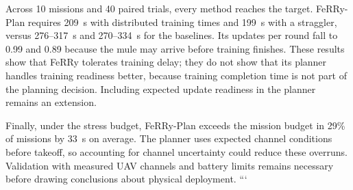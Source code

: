 \documentclass[conference]{IEEEtran}
\newcommand{\sysname}{FeRRy}
\begin{document}
Across 10 missions and 40 paired trials, every method reaches the target.
\sysname{}-Plan requires 209~s with distributed training times and 199~s with
a straggler, versus 276--317~s and 270--334~s for the baselines. Its updates
per round fall to 0.99 and 0.89 because the mule may arrive before training
finishes. These results show that \sysname{} tolerates training delay; they do
not show that its planner handles training readiness better, because training
completion time is not part of the planning decision. Including expected update
readiness in the planner remains an extension.

Finally, under the stress budget, \sysname{}-Plan exceeds the mission budget in
29\% of missions by 33~s on average. The planner uses expected channel
conditions before takeoff, so accounting for channel uncertainty could reduce
these overruns. Validation with measured UAV channels and battery limits remains
necessary before drawing conclusions about physical deployment.
```
\end{document}
